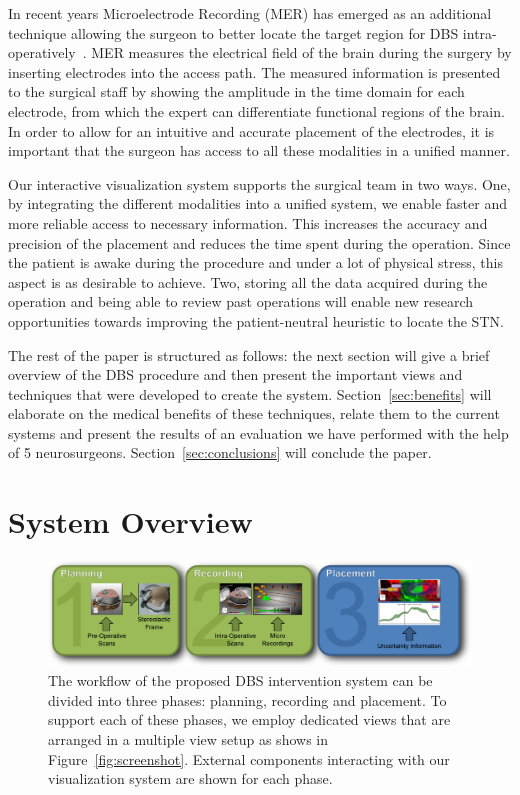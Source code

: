 \documentclass{egpubl}
\begin{document}
In recent years Microelectrode Recording (MER) has emerged as an additional technique allowing the surgeon to better locate the target region for DBS intra-operatively~\cite{Lenz1988}. MER measures the electrical field of the brain during the surgery by inserting electrodes into the access path. The measured information is presented to the surgical staff by showing the amplitude in the time domain for each electrode, from which the expert can differentiate functional regions of the brain. In order to allow for an intuitive and accurate placement of the electrodes, it is important that the surgeon has access to all these modalities in a unified manner.

Our interactive visualization system supports the surgical team in two ways. One, by integrating the different modalities into a unified system, we enable faster and more reliable access to necessary information. This increases the accuracy and precision of the placement and reduces the time spent during the operation. Since the patient is awake during the procedure and under a lot of physical stress, this aspect is as desirable to achieve. Two, storing all the data acquired during the operation and being able to review past operations will enable new research opportunities towards improving the patient-neutral heuristic to locate the STN.

The rest of the paper is structured as follows: the next section will give a brief overview of the DBS procedure and then present the important views and techniques that were developed to create the system. Section~\ref{sec:benefits} will elaborate on the medical benefits of these techniques, relate them to the current systems and present the results of an evaluation we have performed with the help of 5 neurosurgeons. Section~\ref{sec:conclusions} will conclude the paper.

\section{System Overview}\label{sec:setup}
\begin{figure}[t]
    \centering
    \includegraphics[width=0.8\linewidth]{figures/workflow}
    \caption{The workflow of the proposed DBS intervention system can be divided into three phases: planning, recording and placement. To support each of these phases, we employ dedicated views that are arranged in a multiple view setup as shows in Figure~\ref{fig:screenshot}. External components interacting with our visualization system are shown for each phase.}
    \label{fig:workflow}
\end{figure}
\end{document}
